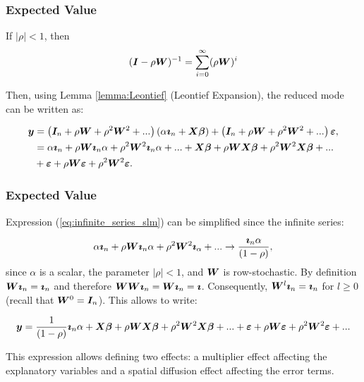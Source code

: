 \documentclass[english,10pt]{beamer}\usepackage[]{graphicx}\usepackage[]{xcolor}
\begin{document}
\begin{frame}
  \frametitle{Expected Value}
  \begin{lemma}\label{lemma:Leontief}
If $\left|\rho\right|  < 1$, then
	\begin{equation*}
	(\bm I - \rho \bm W)^{-1} = \sum_{i = 0} ^{\infty}(\rho \bm W)^{i}
	\end{equation*}
\end{lemma}

Then, using Lemma \ref{lemma:Leontief} (Leontief Expansion), the reduced mode can be written as:

\begin{equation}\label{eq:infinite_series_slm}
  \begin{aligned}
      \bm y & = \left(\bm I_n + \rho\bm W + \rho^2\bm W^2 + ...\right)\left(\alpha \bm\imath_n + \bm X\bm \beta\right) + \left(\bm I_n + \rho\bm W + \rho^2\bm W^2 + ...\right)\bm {\varepsilon}, \\
          & = \alpha\bm\imath_n + \rho\bm W\bm\imath_n\alpha + \rho^2\bm W^2\bm\imath_n\alpha + ... + \bm X\bm \beta + \rho\bm W\bm X\bm \beta + \rho^2\bm W^2\bm X\bm \beta + ... \\
          & + \bm {\varepsilon} + \rho\bm W\bm {\varepsilon} + \rho^2\bm W^2\bm {\varepsilon}.
  \end{aligned}
\end{equation}
\end{frame}

\begin{frame}
  \frametitle{Expected Value}
  Expression (\ref{eq:infinite_series_slm}) can be simplified since the infinite series:

\begin{equation*}
\alpha\bm\imath_n + \rho\bm W\bm\imath_n\alpha + \rho^2\bm W^2\bm\imath_\alpha + ... \to \frac{\bm\imath_n\alpha}{\left(1 - \rho\right)},
\end{equation*}
%
since $\alpha$ is a scalar, the parameter $\left|\rho\right|  < 1$, and $\bm W$ is row-stochastic. By definition $\bm W\bm\imath_n = \bm\imath_n$ and therefore $\bm W\bm W\bm\imath_n = \bm W\bm\imath_n = \bm\imath$. Consequently, $\bm W^l\bm\imath_n = \bm\imath_n$ for $l\geq 0$ (recall that $\bm W^0 = \bm I_n$). This allows to write:

\begin{equation*}
\bm y = \frac{1}{(1-\rho)}\bm\imath_n\alpha + \bm X\bm \beta + \rho\bm W\bm X\bm \beta + \rho^2\bm W^2\bm X\bm \beta + ... + \bm {\varepsilon} + \rho\bm W\bm {\varepsilon} + \rho^2\bm W^2\bm {\varepsilon} + ...
\end{equation*}

This expression allows defining two effects: a multiplier effect affecting the explanatory variables and a spatial diffusion effect affecting the error terms.
\end{frame}
\end{document}
